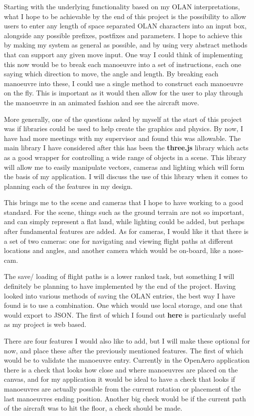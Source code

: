 Starting with the underlying functionality based on my OLAN interpretations, what I hope to be achievable by the end of this project is the possibility to allow users to enter any length of space separated OLAN characters into an input box, alongside any possible prefixes, postfixes and parameters. I hope to achieve this by making my system as general as possible, and by using very abstract methods that can support any given move input. One way I could think of implementing this now would be to break each manoeuvre into a set of instructions, each one saying which direction to move, the angle and length. By breaking each manoeuvre into these, I could use a single method to construct each manoeuvre on the fly. This is important as it would then allow for the user to play through the manoeuvre in an animated fashion and see the aircraft move.

More generally, one of the questions asked by myself at the start of this project was if libraries could be used to help create the graphics and physics. By now, I have had more meetings with my supervisor and found this was allowable. The main library I have considered after this has been the \textbf{three.js} library which acts as a good wrapper for controlling a wide range of objects in a scene. This library will allow me to easily manipulate vectors, cameras and lighting which will form the basis of my application. I will discuss the use of this library when it comes to planning each of the features in my design.

This brings me to the scene and cameras that I hope to have working to a good standard. For the scene, things such as the ground terrain are not so important, and can simply represent a flat land, while lighting could be added, but perhaps after fundamental features are added. As for cameras, I would like it that there is a set of two cameras: one for navigating and viewing flight paths at different locations and angles, and another camera which would be on-board, like a nose-cam.

The save/ loading of flight paths is a lower ranked task, but something I will definitely be planning to have implemented by the end of the project. Having looked into various methods of saving the OLAN entries, the best way I have found is to use a combination. One which would use local storage, and one that would export to JSON. The first of which I found out \textbf{here} is particularly useful as my project is web based.

There are four features I would also like to add, but I will make these optional for now, and place these after the previously mentioned features. The first of which would be to validate the manoeuvre entry. Currently in the OpenAero application there is a check that looks how close and where manoeuvres are placed on the canvas, and for my application it would be ideal to have a check that looks if manoeuvres are actually possible from the current rotation or placement of the last manoeuvres ending position. Another big check would be if the current path of the aircraft was to hit the floor, a check should be made.

